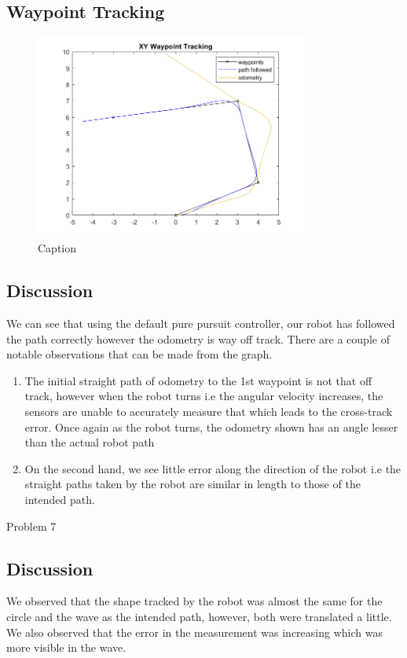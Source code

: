 \documentclass[answers]{exam}
\begin{document}
\begin{questions}
    \subsection*{Waypoint Tracking}
    \begin{figure}[H]
        \centering
        \includegraphics[width=0.8\textwidth]{images/6-default.png}
        \caption{Caption}
        \label{fig:enter-label}
    \end{figure}

    \subsection*{Discussion}
    We can see that using the default pure pursuit controller, our robot has
    followed the path correctly however the odometry is way off track. There are a
    couple of notable observations that can be made from the graph.
    \begin{enumerate}
        \item The initial straight path of odometry to the 1st waypoint is not that off
              track, however when the robot turns i.e the angular velocity increases, the
              sensors are unable to accurately measure that which leads to the cross-track
              error. Once again as the robot turns, the odometry shown has an angle lesser
              than the actual robot path
        \item On the second hand, we see little error along the direction of the robot i.e
              the straight paths taken by the robot are similar in length to those of the
              intended path.
    \end{enumerate}

    \question Problem 7
    \subsection*{Discussion}
    We observed that the shape tracked by the robot was almost the same for the
    circle and the wave as the intended path, however, both were translated a
    little. We also observed that the error in the measurement was increasing which
    was more visible in the wave.


\end{questions}
\end{document}
